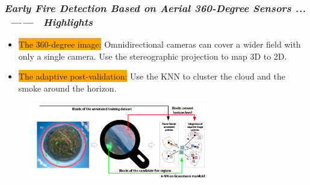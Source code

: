 \begin{frame}
    \frametitle{\textit{Early Fire Detection Based on Aerial 360-Degree Sensors
    ...  ~------~ Highlights}}

    \begin{itemize}
        \item \Large \colorbox{orange}{The 360-degree image:}\linebreak
            \normalsize
            Omnidirectional cameras can cover a wider field with only a single
            camera. Use the stereographic projection to map 3D to 2D.
        \item \Large \colorbox{orange}{The adaptive post-validation:}\linebreak
            \normalsize
            Use the KNN to cluster the cloud and the smoke around the horizon.
    \end{itemize}

    \begin{figure}[H]
        \centering
        \includegraphics[width=0.7\textwidth]{./imgs/adaptive_validation}
    \end{figure}

\end{frame}
